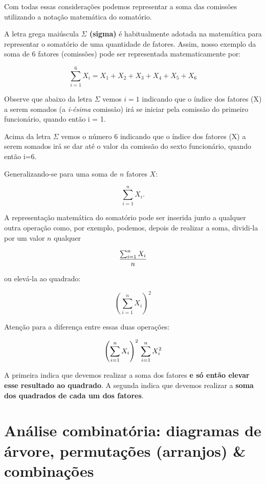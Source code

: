 \documentclass[
]{book}
\begin{document}
Com todas essas considerações podemos representar a soma das comissões utilizando a notação matemática do somatório.

A letra grega maiúscula \textbf{\(\Sigma\) (sigma)} é habitualmente adotada na matemática para representar o somatório de uma quantidade de fatores. Assim, nosso exemplo da soma de 6 fatores (comissões) pode ser representada matematicamente por:

\[
\sum_{i=1}^{6}{X_{i}} = X_{1}+X_{2}+X_{3}+X_{4}+X_{5}+X_{6}
\]

Observe que abaixo da letra \(\Sigma\) vemos \(i=1\) indicando que o índice dos fatores (X) a serem somados (a \emph{i-ésima} comissão) irá se iniciar pela comissão do primeiro funcionário, quando então i = 1.

Acima da letra \(\Sigma\) vemos o número \(6\) indicando que o índice dos fatores (X) a serem somados irá se dar até o valor da comissão do sexto funcionário, quando então i=6.

Generalizando-se para uma soma de \(n\) fatores \(X\):

\[
\sum_{i=1}^n{X_{i}}.
\]

A representação matemática do somatório pode ser inserida junto a qualquer outra operação como, por exemplo, podemos, depois de realizar a soma, dividi-la por um valor \(n\) qualquer

\[
\frac{\sum_{i=1}^n{X_{i}}}{n} \\
\]

ou elevá-la ao quadrado:

\[
\left(\sum_{i=1}^n{X_{i}}\right)^{2}
\]

Atenção para a diferença entre essas duas operações:

\[
\left(\sum_{i=1}^n{X_{i}}\right)^{2}   \\
\sum_{i=1}^n{X_{i}^{2}}
\]

A primeira indica que devemos realizar a soma dos fatores \textbf{e só então elevar esse resultado ao quadrado}. A segunda indica que devemos realizar a \textbf{soma dos quadrados de cada um dos fatores}.

\hypertarget{anuxe1lise-combinatuxf3ria-diagramas-de-uxe1rvore-permutauxe7uxf5es-arranjos-combinauxe7uxf5es}{%
\section{Análise combinatória: diagramas de árvore, permutações (arranjos) \& combinações}\label{anuxe1lise-combinatuxf3ria-diagramas-de-uxe1rvore-permutauxe7uxf5es-arranjos-combinauxe7uxf5es}}
\end{document}
